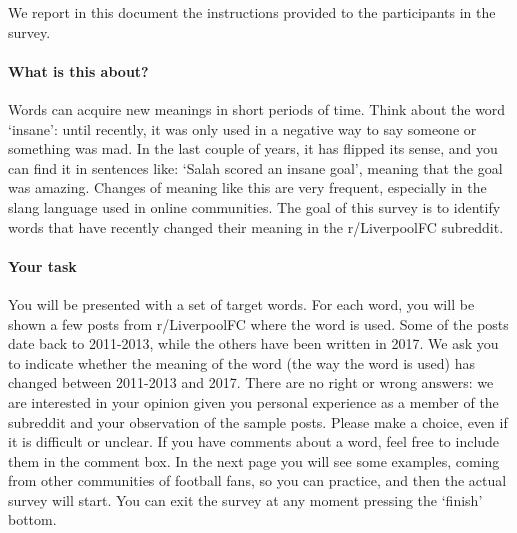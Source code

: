 \documentclass[11pt,a4paper]{article}
\begin{document}
%
%
%


\begin{minipage}{15cm}

We report in this document the instructions provided to the participants in the survey.

\vspace*{0.5cm}

\paragraph{What is this about?}
Words can acquire new meanings in short periods of time. Think about the word `insane': until recently, it was only used in a negative way to say someone or something was mad. In the last couple of years, it has flipped its sense, and you can find it in sentences like: `Salah scored an insane goal', meaning that the goal was amazing.
Changes of meaning like this are very frequent, especially in the slang language used in online communities. The goal of this survey is to identify words that have recently changed their meaning in the r/LiverpoolFC subreddit.
\\
\paragraph{Your task}
You will be presented with a set of target words. For each word, you will be shown a few posts from r/LiverpoolFC where the word is used. Some of the posts date back to 2011-2013, while the others have been written in 2017.
We ask you to indicate whether the meaning of the word (the way the word is used) has changed between 2011-2013 and 2017. There are no right or wrong answers: we are interested in your opinion given you personal experience as a member of the subreddit and your observation of the sample posts. Please make a choice, even if it is difficult or unclear. If you have comments about a word, feel free to include them in the comment box. In the next page you will see some examples, coming from other communities of football fans, so you can practice, and then the actual survey will start. You can exit the survey at any moment pressing the `finish' bottom. 


\end{minipage}
\end{document}
